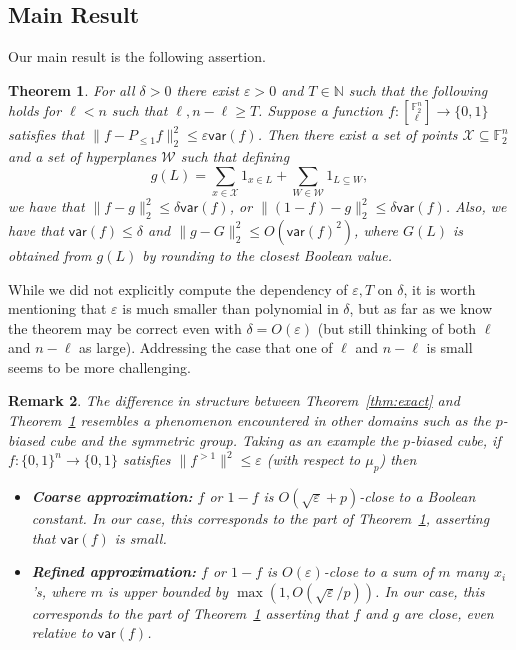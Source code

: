 \documentclass[11pt]{article}
\newtheorem{thm}{Theorem}[section]
\newtheorem{remark}[thm]{Remark}
\newcommand\norm[1]{\| #1 \|}
\newcommand\eps{\varepsilon}
\renewcommand\geq{\geqslant}
\renewcommand\leq{\leqslant}
\providecommand{\sqbinom}[2]{\genfrac{[}{]}{0pt}{}{#1}{#2}}
\begin{document}
\subsection{Main Result}
Our main result is the following assertion.
\begin{thm}\label{thm:main}
    For all $\delta>0$ there exist $\eps>0$ and $T\in\mathbb{N}$ such that the following holds for $\ell<n$ such that $\ell,n-\ell\geq T$. Suppose a function $f\colon {\sqbinom{\mathbb{F}_2^n}{\ell}}\to\{0,1\}$ satisfies that 
    $\norm{f-P_{\leq 1} f}_2^2\leq \eps\mathsf{var}(f)$. Then there exist a set of points $\mathcal{X}\subseteq \mathbb{F}_2^n$ and a set of hyperplanes $\mathcal{W}$ such that defining
    \[
    g(L) = \sum\limits_{x\in\mathcal{X}}1_{x\in L}
    +
    \sum\limits_{W\in\mathcal{W}}1_{L\subseteq W}, 
    \]
    we have that $\norm{f-g}_2^2\leq \delta \mathsf{var}(f)$, or 
    $\norm{(1-f)-g}_2^2\leq \delta\mathsf{var}(f)$. Also, we have that $\mathsf{var}(f)\leq \delta$ and 
    $\norm{g - G}_2^2 \leq O(\mathsf{var}(f)^2)$, where $G(L)$ is obtained from $g(L)$ by rounding to the closest Boolean value.
\end{thm}
While we did not explicitly compute the dependency of $\eps, T$ on $\delta$, it is worth mentioning that $\eps$ is much smaller than polynomial in $\delta$, but as far as we know the theorem may be correct even with $\delta = O(\eps)$ (but still thinking of both $\ell$ and $n-\ell$ as large). Addressing the case that one of $\ell$ and $n-\ell$ is small seems to be more challenging.

\begin{remark}
The difference in structure between Theorem~\ref{thm:exact} and Theorem~\ref{thm:main} resembles a phenomenon encountered in other domains such as the $p$-biased cube and the symmetric group. Taking as an example the $p$-biased cube, if $f\colon \{0,1\}^n \to \{0,1\}$ satisfies $\|f^{>1}\|^2 \le \eps$ (with respect to $\mu_p$) then
\begin{itemize}
    \item \textbf{Coarse approximation:} $f$ or $1-f$ is $O(\sqrt{\eps} + p)$-close to a Boolean constant. In our case, this corresponds to the part of Theorem~\ref{thm:main}, asserting that $\mathsf{var}(f)$ is small.
    \item \textbf{Refined approximation:} $f$ or $1-f$ is $O(\eps)$-close to a sum of $m$ many $x_i$'s, where $m$ is upper bounded by $\max(1,O(\sqrt{\eps}/p))$. In our case, this corresponds to the part of Theorem~\ref{thm:main} asserting that $f$ and $g$ are close, even relative to $\mathsf{var}(f)$.
\end{itemize}
\end{remark}
\end{document}
